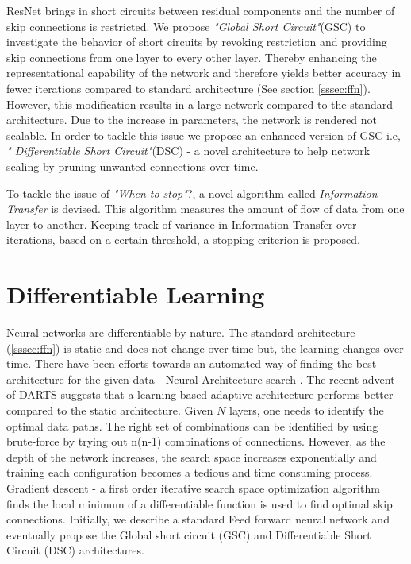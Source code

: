 \documentclass{article}
\begin{document}
ResNet brings in short circuits between residual components and the number of skip connections is restricted. We propose \emph{"Global Short Circuit"}(GSC) to investigate the behavior of short circuits by revoking restriction and providing skip connections from one layer to every other layer. Thereby enhancing the representational capability of the network and therefore yields better accuracy in fewer iterations compared to standard architecture (See section \ref{sssec:ffn}). However, this modification results in a large network compared to the standard architecture. Due to the increase in parameters, the network is rendered not scalable. In order to tackle this issue we propose an enhanced version of GSC i.e, \emph{" Differentiable Short Circuit"}(DSC) - a novel architecture to help network scaling by pruning unwanted connections over time.

To tackle the issue of \emph{"When to stop"}?, a novel algorithm called \emph{Information Transfer} is devised. This algorithm measures the amount of flow of data from one layer to another. Keeping track of variance in Information Transfer over iterations, based on a certain threshold, a stopping criterion is proposed.

\section{Differentiable Learning}
\label{sec:headings}

Neural networks are differentiable by nature. The standard architecture (\ref{sssec:ffn}) is static and does not change over time but, the learning changes over time. There have been efforts towards an automated way of finding the best architecture for the given data - Neural Architecture search \cite{Zoph2016NeuralAS}. The recent advent of DARTS \cite{Liu2019DARTSDA} suggests that a learning based adaptive architecture performs better compared to the static architecture. Given $N$ layers, one needs to identify the optimal data paths. The right set of combinations can be identified by using brute-force by trying out n(n-1) combinations of connections. However, as the depth of the network increases, the search space increases exponentially and training each configuration becomes a tedious and time consuming process. Gradient descent \cite{ruder2016overview} - a first order iterative search space optimization algorithm finds the local minimum of a differentiable function is used to find optimal skip connections. Initially, we describe a standard Feed forward neural network and eventually propose the Global short circuit (GSC) and Differentiable Short Circuit (DSC) architectures.
\end{document}
